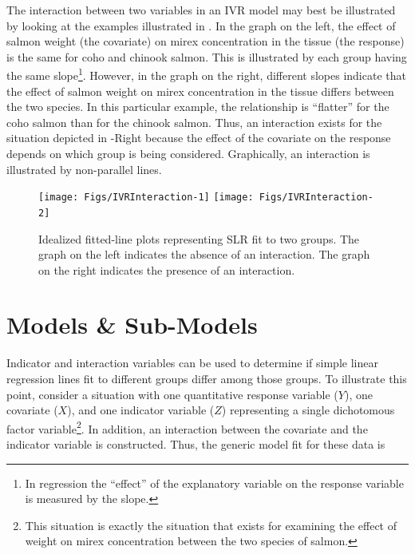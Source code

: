 \documentclass[10pt,openany]{book}\usepackage[]{graphicx}\usepackage[]{color}
\newenvironment{knitrout}{}{} %
\begin{document}

\vspace{-12pt}

The interaction between two variables in an IVR model may best be illustrated by looking at the examples illustrated in .  In the graph on the left, the effect of salmon weight (the covariate) on mirex concentration in the tissue (the response) is the same for coho and chinook salmon.  This is illustrated by each group having the same slope\footnote{In regression the ``effect'' of the explanatory variable on the response variable is measured by the slope.}.  However, in the graph on the right, different slopes indicate that the effect of salmon weight on mirex concentration in the tissue differs between the two species.  In this particular example, the relationship is ``flatter'' for the coho salmon than for the chinook salmon.  Thus, an interaction exists for the situation depicted in -Right because the effect of the covariate on the response depends on which group is being considered.  Graphically, an interaction is illustrated by non-parallel lines.

\begin{knitrout}
\color{fgcolor}\begin{figure}[!h]

{\centering \texttt{[image: Figs/IVRInteraction-1]} 
\texttt{[image: Figs/IVRInteraction-2]} 

}

\caption[Idealized fitted-line plots representing SLR fit to two groups]{Idealized fitted-line plots representing SLR fit to two groups.  The graph on the left indicates the absence of an interaction.  The graph on the right indicates the presence of an interaction.}\label{fig:IVRInteraction}
\end{figure}


\end{knitrout}



\section{Models \& Sub-Models}
Indicator and interaction variables can be used to determine if simple linear regression lines fit to different groups differ among those groups.  To illustrate this point, consider a situation with one quantitative response variable ($Y$), one covariate ($X$), and one indicator variable ($Z$) representing a single dichotomous factor variable\footnote{This situation is exactly the situation that exists for examining the effect of weight on mirex concentration between the two species of salmon.}.  In addition, an interaction between the covariate and the indicator variable is constructed.  Thus, the generic model fit for these data is
\end{document}
